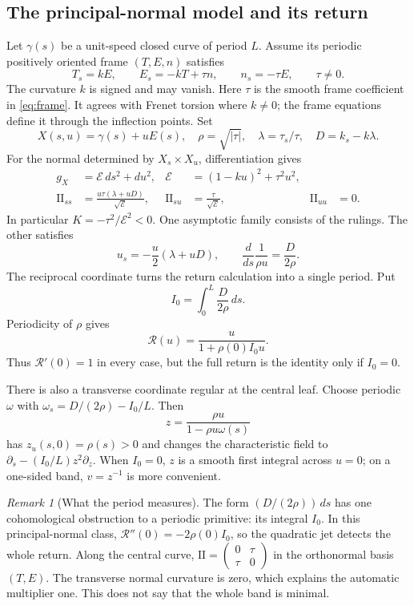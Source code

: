 \documentclass[11pt]{amsart}
\theoremstyle{definition}
\theoremstyle{remark}
\newtheorem{remark}[theorem]{Remark}
\newcommand{\II}{\mathrm{II}}\newcommand{\Gmap}{\mathcal G}
\numberwithin{equation}{section}
\begin{document}
\subsection{The principal-normal model and its return}
Let $\gamma(s)$ be a unit-speed closed curve of period $L$. Assume its
periodic positively oriented frame $(T,E,n)$ satisfies
\begin{equation}\label{eq:frame}
 T_s=kE,\qquad E_s=-kT+\tau n,\qquad n_s=-\tau E,
 \qquad \tau\ne0.
\end{equation}
The curvature $k$ is signed and may vanish. Here $\tau$ is the
smooth frame coefficient in \eqref{eq:frame}. It agrees with Frenet
torsion where $k\ne0$; the frame equations define it through the
inflection points. Set
\[
 X(s,u)=\gamma(s)+uE(s),\quad \rho=\sqrt{|\tau|},\quad
 \lambda=\tau_s/\tau,\quad D=k_s-k\lambda.
\]
For the normal determined by $X_s\times X_u$, differentiation gives
\begin{align}\label{eq:ruled-II}
 g_X&=\mathcal E\,ds^2+du^2,
 &\mathcal E&=(1-ku)^2+\tau^2u^2,\\
 \II_{ss}&=\frac{u\tau(\lambda+uD)}{\sqrt{\mathcal E}},
 &\II_{su}&=\frac\tau{\sqrt{\mathcal E}},
 &\II_{uu}&=0.\nonumber
\end{align}
In particular $K=-\tau^2/\mathcal E^2<0$. One asymptotic family consists
of the rulings. The other satisfies
\[
 u_s=-\frac u2(\lambda+uD),\qquad
 \frac d{ds}\frac1{\rho u}=\frac D{2\rho}.
\]
The reciprocal coordinate turns the return calculation into a single
period. Put
\[
 I_0=\int_0^L\frac D{2\rho}\,ds.
\]
Periodicity of $\rho$ gives
\begin{equation}\label{eq:return}
 \mathcal R(u)=\frac{u}{1+\rho(0)I_0u}.
\end{equation}
Thus $\mathcal R'(0)=1$ in every case, but the full return is the identity
only if $I_0=0$.

There is also a transverse coordinate regular at the central leaf.
Choose periodic $\omega$ with $\omega_s=D/(2\rho)-I_0/L$. Then
\begin{equation}\label{eq:regular-holonomy-coordinate}
 z=\frac{\rho u}{1-\rho u\omega(s)}
\end{equation}
has $z_u(s,0)=\rho(s)>0$ and changes the characteristic field to
$\partial_s-(I_0/L)z^2\partial_z$. When $I_0=0$, $z$ is a smooth first
integral across $u=0$; on a one-sided band, $v=z^{-1}$ is more convenient.

\begin{remark}[What the period measures]\label{rem:period-holonomy}
The form $(D/(2\rho))\,ds$ has one cohomological obstruction to a
periodic primitive: its integral $I_0$. In this principal-normal class,
$\mathcal R''(0)=-2\rho(0)I_0$, so the quadratic jet detects the whole
return. Along the central curve,
$\II=\left(\begin{smallmatrix}0&\tau\\\tau&0\end{smallmatrix}\right)$
in the orthonormal basis $(T,E)$. The transverse normal curvature is zero,
which explains the automatic multiplier one. This does not say that the
whole band is minimal.
\end{remark}
\end{document}
